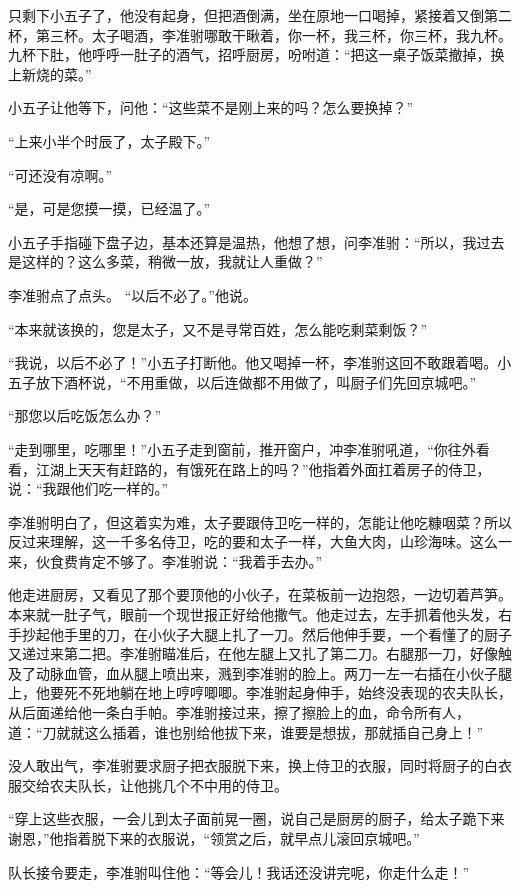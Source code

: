 只剩下小五子了，他没有起身，但把酒倒满，坐在原地一口喝掉，紧接着又倒第二杯，第三杯。太子喝酒，李准驸哪敢干瞅着，你一杯，我三杯，你三杯，我九杯。九杯下肚，他呼呼一肚子的酒气，招呼厨房，吩咐道：“把这一桌子饭菜撤掉，换上新烧的菜。”

小五子让他等下，问他：“这些菜不是刚上来的吗？怎么要换掉？”

“上来小半个时辰了，太子殿下。”

“可还没有凉啊。”

“是，可是您摸一摸，已经温了。”

小五子手指碰下盘子边，基本还算是温热，他想了想，问李准驸：“所以，我过去是这样的？这么多菜，稍微一放，我就让人重做？”

李准驸点了点头。 “以后不必了。”他说。

“本来就该换的，您是太子，又不是寻常百姓，怎么能吃剩菜剩饭？”

“我说，以后不必了！”小五子打断他。他又喝掉一杯，李准驸这回不敢跟着喝。小五子放下酒杯说，“不用重做，以后连做都不用做了，叫厨子们先回京城吧。”

“那您以后吃饭怎么办？”

“走到哪里，吃哪里！”小五子走到窗前，推开窗户，冲李准驸吼道，“你往外看看，江湖上天天有赶路的，有饿死在路上的吗？”他指着外面扛着房子的侍卫，说：“我跟他们吃一样的。”

李准驸明白了，但这着实为难，太子要跟侍卫吃一样的，怎能让他吃糠咽菜？所以反过来理解，这一千多名侍卫，吃的要和太子一样，大鱼大肉，山珍海味。这么一来，伙食费肯定不够了。李准驸说：“我着手去办。”

他走进厨房，又看见了那个要顶他的小伙子，在菜板前一边抱怨，一边切着芦笋。本来就一肚子气，眼前一个现世报正好给他撒气。他走过去，左手抓着他头发，右手抄起他手里的刀，在小伙子大腿上扎了一刀。然后他伸手要，一个看懂了的厨子又递过来第二把。李准驸瞄准后，在他左腿上又扎了第二刀。右腿那一刀，好像触及了动脉血管，血从腿上喷出来，溅到李准驸的脸上。两刀一左一右插在小伙子腿上，他要死不死地躺在地上哼哼唧唧。李准驸起身伸手，始终没表现的农夫队长，从后面递给他一条白手帕。李准驸接过来，擦了擦脸上的血，命令所有人，道：“刀就就这么插着，谁也别给他拔下来，谁要是想拔，那就插自己身上！”

没人敢出气，李准驸要求厨子把衣服脱下来，换上侍卫的衣服，同时将厨子的白衣服交给农夫队长，让他挑几个不中用的侍卫。

“穿上这些衣服，一会儿到太子面前晃一圈，说自己是厨房的厨子，给太子跪下来谢恩，”他指着脱下来的衣服说，“领赏之后，就早点儿滚回京城吧。”

队长接令要走，李准驸叫住他：“等会儿！我话还没讲完呢，你走什么走！”

